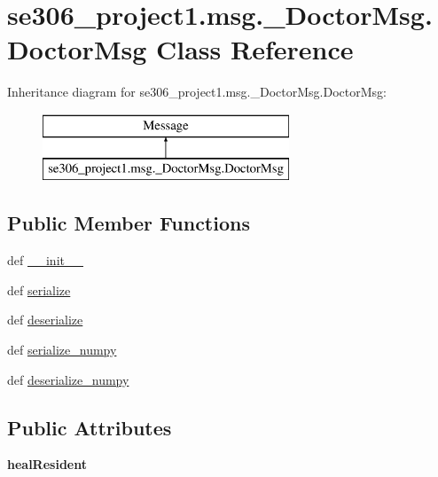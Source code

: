 \hypertarget{classse306__project1_1_1msg_1_1__DoctorMsg_1_1DoctorMsg}{\section{se306\-\_\-project1.\-msg.\-\_\-\-Doctor\-Msg.\-Doctor\-Msg Class Reference}
\label{classse306__project1_1_1msg_1_1__DoctorMsg_1_1DoctorMsg}
}
Inheritance diagram for se306\-\_\-project1.\-msg.\-\_\-\-Doctor\-Msg.\-Doctor\-Msg\-:\begin{figure}[H]
\begin{center}
\leavevmode
\includegraphics[height=2.000000cm]{classse306__project1_1_1msg_1_1__DoctorMsg_1_1DoctorMsg}
\end{center}
\end{figure}
\subsection*{Public Member Functions}
\begin{DoxyCompactItemize}
\item 
def \hyperlink{classse306__project1_1_1msg_1_1__DoctorMsg_1_1DoctorMsg_acdab3728232479c2431f3dad412d3289}{\-\_\-\-\_\-init\-\_\-\-\_\-}
\item 
def \hyperlink{classse306__project1_1_1msg_1_1__DoctorMsg_1_1DoctorMsg_a17a7a9c4016eecae4ec0da40bbd86e31}{serialize}
\item 
def \hyperlink{classse306__project1_1_1msg_1_1__DoctorMsg_1_1DoctorMsg_ae585ea7a7ad1bf035a68ad1d5eebd081}{deserialize}
\item 
def \hyperlink{classse306__project1_1_1msg_1_1__DoctorMsg_1_1DoctorMsg_a754dadda899fe2abb3b84b8f7ee62ef0}{serialize\-\_\-numpy}
\item 
def \hyperlink{classse306__project1_1_1msg_1_1__DoctorMsg_1_1DoctorMsg_afb7de726ee1e81daf506f49c726d4d6c}{deserialize\-\_\-numpy}
\end{DoxyCompactItemize}
\subsection*{Public Attributes}
\begin{DoxyCompactItemize}
\item 
\hypertarget{classse306__project1_1_1msg_1_1__DoctorMsg_1_1DoctorMsg_a711c341276dd48d29a5023f80ad91df0}{{\bfseries heal\-Resident}}\label{classse306__project1_1_1msg_1_1__DoctorMsg_1_1DoctorMsg_a711c341276dd48d29a5023f80ad91df0}

\end{DoxyCompactItemize}


